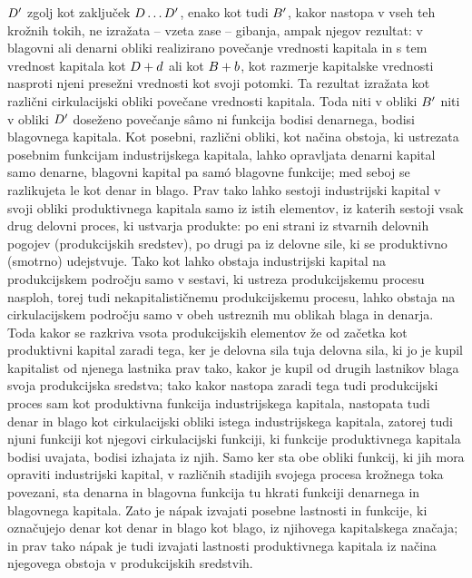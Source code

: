 \documentclass[kapital_02.tex]{subfiles}
\begin{document}
\( D' \) zgolj kot zaključek \( D \dots D' \), enako kot tudi \( B' \), kakor nastopa v vseh teh krožnih tokih, ne izražata -- vzeta zase -- gibanja, ampak njegov rezultat: v blagovni ali denarni obliki realizirano povečanje vrednosti kapitala in s tem vrednost kapitala kot \( D + d \) ali kot \( B + b \), kot razmerje kapitalske vrednosti nasproti njeni presežni vrednosti kot svoji potomki. Ta rezultat izražata kot različni cirkulacijski obliki povečane vrednosti kapitala. Toda niti v obliki \( B' \) niti v obliki \KPEstran \( D' \) doseženo povečanje s\^amo ni funkcija bodisi denarnega, bodisi blagovnega kapitala. Kot posebni, različni obliki, kot načina obstoja, ki ustrezata posebnim funkcijam industrijskega kapitala, lahko opravljata denarni kapital samo denarne, blagovni kapital pa sam\'o blagovne funkcije; med seboj se razlikujeta le kot denar in blago. Prav tako lahko sestoji industrijski kapital v svoji obliki produktivnega kapitala samo iz istih elementov, iz katerih sestoji vsak drug delovni proces, ki ustvarja produkte: po eni strani iz stvarnih delovnih pogojev (produkcijskih sredstev), po drugi pa iz delovne sile, ki se produktivno (smotrno) udejstvuje. Tako kot lahko obstaja industrijski kapital na produkcijskem področju samo v sestavi, ki ustreza produkcijskemu procesu nasploh, torej tudi nekapitalističnemu produkcijskemu procesu, lahko obstaja na cirkulacijskem področju samo v obeh ustreznih mu oblikah blaga in denarja. Toda kakor se razkriva vsota produkcijskih elementov že od začetka kot produktivni kapital zaradi tega, ker je delovna sila tuja delovna sila, ki jo je kupil kapitalist od njenega lastnika prav tako, kakor je kupil od drugih lastnikov blaga svoja produkcijska sredstva; tako kakor nastopa zaradi tega tudi produkcijski proces sam kot produktivna funkcija industrijskega kapitala, nastopata tudi denar in blago kot cirkulacijski obliki istega industrijskega kapitala, zatorej tudi njuni funkciji kot njegovi cirkulacijski funkciji, ki funkcije produktivnega kapitala bodisi uvajata, bodisi izhajata iz njih. Samo ker sta obe obliki funkcij, ki jih mora opraviti industrijski kapital, v različnih stadijih svojega procesa krožnega toka povezani, sta denarna in blagovna funkcija tu hkrati funkciji denarnega in blagovnega kapitala. Zato je n\'apak izvajati posebne lastnosti in funkcije, ki označujejo denar kot denar in blago kot blago, iz njihovega kapitalskega značaja; in prav tako n\'apak je tudi izvajati lastnosti produktivnega kapitala iz načina njegovega obstoja v produkcijskih sredstvih.
\end{document}

